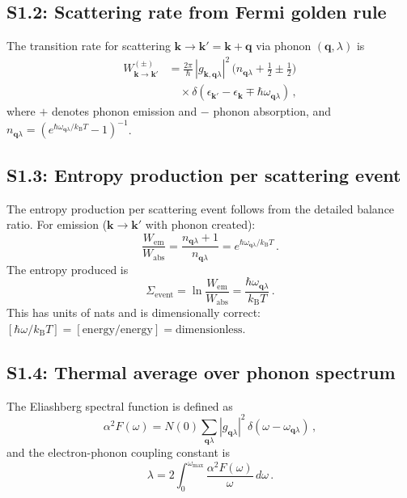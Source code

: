 \documentclass[prb,twocolumn,superscriptaddress,longbibliography,floatfix]{revtex4-2}
\newcommand{\kB}{k_{\mathrm{B}}}
\begin{document}
\subsection{S1.2: Scattering rate from Fermi golden rule}

The transition rate for scattering $\bm{k} \to \bm{k}' = \bm{k}+\bm{q}$
via phonon $(\bm{q},\lambda)$ is
\begin{align}\label{eq:S1_rate}
  W_{\bm{k}\to\bm{k}'}^{(\pm)} &= \frac{2\pi}{\hbar}\,
  |g_{\bm{k},\bm{q}\lambda}|^2\,
  \bigl(n_{\bm{q}\lambda} + \tfrac{1}{2} \pm \tfrac{1}{2}\bigr)
  \nonumber\\
  &\quad \times \delta(\epsilon_{\bm{k}'} - \epsilon_{\bm{k}}
  \mp \hbar\omega_{\bm{q}\lambda})\,,
\end{align}
where $+$ denotes phonon emission and $-$ phonon absorption,
and $n_{\bm{q}\lambda} = (e^{\hbar\omega_{\bm{q}\lambda}/\kB T} - 1)^{-1}$.

\subsection{S1.3: Entropy production per scattering event}

The entropy production per scattering event follows from
the detailed balance ratio.  For emission ($\bm{k} \to \bm{k}'$
with phonon created):
\begin{equation}
  \frac{W_{\mathrm{em}}}{W_{\mathrm{abs}}}
  = \frac{n_{\bm{q}\lambda} + 1}{n_{\bm{q}\lambda}}
  = e^{\hbar\omega_{\bm{q}\lambda}/\kB T}\,.
\end{equation}
The entropy produced is
\begin{equation}\label{eq:S1_sigma_event}
  \Sigma_{\mathrm{event}} = \ln\frac{W_{\mathrm{em}}}{W_{\mathrm{abs}}}
  = \frac{\hbar\omega_{\bm{q}\lambda}}{\kB T}\,.
\end{equation}
This has units of nats and is dimensionally correct:
$[\hbar\omega/\kB T] = [\mathrm{energy}/\mathrm{energy}]
= \text{dimensionless}$.

\subsection{S1.4: Thermal average over phonon spectrum}

The Eliashberg spectral function is defined as
\begin{equation}
  \alpha^2 F(\omega) = N(0) \sum_{\bm{q}\lambda}
  |g_{\bm{q}\lambda}|^2\, \delta(\omega - \omega_{\bm{q}\lambda})\,,
\end{equation}
and the electron-phonon coupling constant is
\begin{equation}
  \lambda = 2\int_0^{\omega_{\max}} \frac{\alpha^2 F(\omega)}{\omega}\, d\omega\,.
\end{equation}
\end{document}
